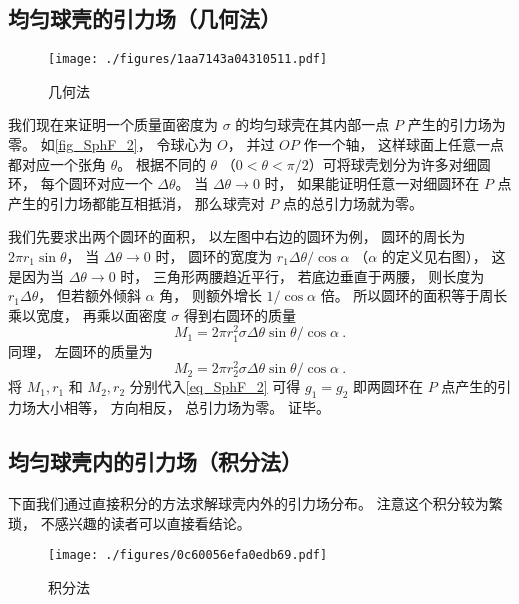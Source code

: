 \subsection{均匀球壳的引力场（几何法）}\label{sub_SphF_1}

\begin{figure}[ht]
\centering
\texttt{[image: ./figures/1aa7143a04310511.pdf]}
\caption{几何法} \label{fig_SphF_2}
\end{figure}

我们现在来证明一个质量面密度为 $\sigma$ 的均匀球壳在其内部一点 $P$ 产生的引力场为零。 如\autoref{fig_SphF_2}， 令球心为 $O$， 并过 $OP$ 作一个轴， 这样球面上任意一点都对应一个张角 $\theta$。 根据不同的 $\theta$ （$0 < \theta < \pi/2$）可将球壳划分为许多对细圆环， 每个圆环对应一个 $\Delta\theta$。 当 $\Delta\theta\to 0$ 时， 如果能证明任意一对细圆环在 $P$ 点产生的引力场都能互相抵消， 那么球壳对 $P$ 点的总引力场就为零。

我们先要求出两个圆环的面积， 以左图中右边的圆环为例， 圆环的周长为 $2\pi r_1\sin\theta$， 当 $\Delta\theta\to 0$ 时， 圆环的宽度为 $r_1\Delta\theta/\cos\alpha$ （$\alpha$ 的定义见右图）， 这是因为当 $\Delta \theta \to 0$ 时， 三角形两腰趋近平行， 若底边垂直于两腰， 则长度为 $r_1\Delta\theta$， 但若额外倾斜 $\alpha$ 角， 则额外增长 $1/\cos\alpha$ 倍。 所以圆环的面积等于周长乘以宽度， 再乘以面密度 $\sigma$ 得到右圆环的质量
\begin{equation}
M_1 = 2\pi r_1^2 \sigma \Delta\theta\sin\theta /\cos\alpha~.
\end{equation}
同理， 左圆环的质量为
\begin{equation}
M_2 = 2\pi r_2^2 \sigma \Delta\theta\sin\theta /\cos\alpha~.
\end{equation}
将 $M_1, r_1$ 和 $M_2, r_2$ 分别代入\autoref{eq_SphF_2} 可得 $g_1 = g_2$ 即两圆环在 $P$ 点产生的引力场大小相等， 方向相反， 总引力场为零。 证毕。

\subsection{均匀球壳内的引力场（积分法）}
下面我们通过直接积分的方法求解球壳内外的引力场分布。 注意这个积分较为繁琐， 不感兴趣的读者可以直接看结论。

\begin{figure}[ht]
\centering
\texttt{[image: ./figures/0c60056efa0edb69.pdf]}
\caption{积分法} \label{fig_SphF_3}
\end{figure}

